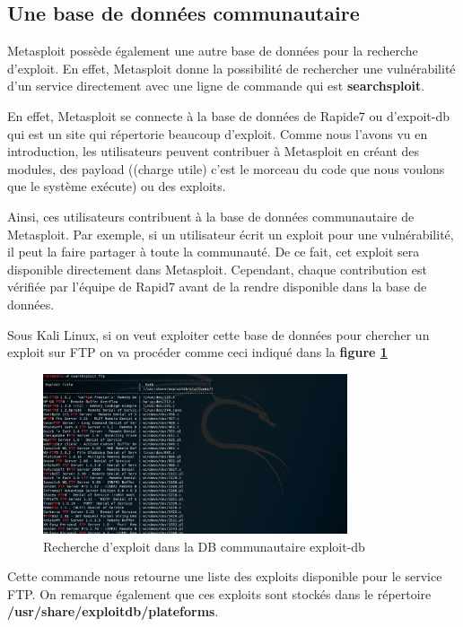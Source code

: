 
\subsection{Une base de données communautaire}
Metasploit possède également une autre base de données pour la recherche d'exploit. En effet, Metasploit donne la possibilité de rechercher une vulnérabilité d'un service directement avec une ligne de commande qui est \textbf{searchsploit}.

En effet, Metasploit se connecte à la base de données de Rapide7 ou d'expoit-db qui est un site qui répertorie beaucoup d'exploit. Comme nous l'avons vu en introduction, les utilisateurs peuvent contribuer à Metasploit en créant des modules, des payload ((charge utile) c'est le morceau du code que nous voulons que le système exécute) ou des exploits. 

Ainsi, ces utilisateurs contribuent à la base de données communautaire de Metasploit. Par exemple, si un utilisateur écrit un exploit pour une vulnérabilité, il peut la faire partager à toute la communauté. De ce fait, cet exploit sera disponible directement dans Metasploit. Cependant, chaque contribution est vérifiée par l'équipe de Rapid7 avant de la rendre disponible dans la base de données.

Sous Kali Linux, si on veut exploiter cette base de données pour chercher un exploit sur FTP on va procéder comme ceci indiqué dans la \textbf{figure \ref{fig:exploit-db}}

\begin{figure}[htp]
  \centering
  \setlength\figureheight{7cm}
  \setlength\figurewidth{9cm}
  \includegraphics[width=0.8\textwidth]{oui/Ancien/imangeancien/metasploit/searchsploit-ex.PNG}
  \caption{Recherche d'exploit dans la DB communautaire exploit-db}
  \label{fig:exploit-db}
\end{figure}

\noindent Cette commande nous retourne une liste des exploits disponible pour le service FTP. On remarque également que ces exploits sont stockés dans le répertoire \textbf{/usr/share/exploitdb/plateforms}.

